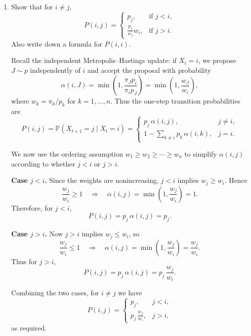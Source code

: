 \documentclass[answers,12pt,addpoints]{exam}
\begin{document}
\begin{enumerate}
    \item Show that for $i \neq j$,
    \[
    P(i,j) =
    \begin{cases}
        p_j, & \text{if } j < i,\\[4pt]
        \displaystyle \frac{p_j}{w_j} w_i, & \text{if } j > i.
    \end{cases}
    \]
    Also write down a formula for $P(i,i)$.
    \begin{solution}
        Recall the independent Metropolis--Hastings update: if $X_t = i$, we propose
$J \sim p$ independently of $i$ and accept the proposal with probability
\[
\alpha(i,J)
= \min\!\left(1,\frac{\pi_J p_i}{\pi_i p_J}\right)
= \min\!\left(1,\frac{w_J}{w_i}\right),
\]
where $w_k = \pi_k/p_k$ for $k=1,\dots,n$. Thus the one-step transition
probabilities are
\[
P(i,j)
= \mathbb{P}(X_{t+1}=j \mid X_t=i)
=
\begin{cases}
p_j\,\alpha(i,j), & j \neq i,\\[4pt]
1 - \displaystyle\sum_{k\neq i} p_k\,\alpha(i,k), & j = i.
\end{cases}
\]

We now use the ordering assumption $w_1 \ge w_2 \ge \cdots \ge w_n$ to simplify
$\alpha(i,j)$ according to whether $j<i$ or $j>i$.

\medskip
\noindent\textbf{Case $j<i$.}
Since the weights are nonincreasing, $j<i$ implies $w_j \ge w_i$. Hence
\[
\frac{w_j}{w_i} \ge 1
\quad\Longrightarrow\quad
\alpha(i,j) = \min\!\left(1,\frac{w_j}{w_i}\right) = 1.
\]
Therefore, for $j<i$,
\[
P(i,j) = p_j\,\alpha(i,j) = p_j.
\]

\medskip
\noindent\textbf{Case $j>i$.}
Now $j>i$ implies $w_j \le w_i$, so
\[
\frac{w_j}{w_i} \le 1
\quad\Longrightarrow\quad
\alpha(i,j) = \min\!\left(1,\frac{w_j}{w_i}\right)
= \frac{w_j}{w_i}.
\]
Thus for $j>i$,
\[
P(i,j) = p_j\,\alpha(i,j)
= p_j\,\frac{w_j}{w_i}.
\]

Combining the two cases, for $i\neq j$ we have
\[
P(i,j) =
\begin{cases}
p_j, & j < i,\\[4pt]
\displaystyle p_j\,\frac{w_j}{w_i}, & j > i,
\end{cases}
\]
as required.


\end{solution}
\end{enumerate}
\end{document}
